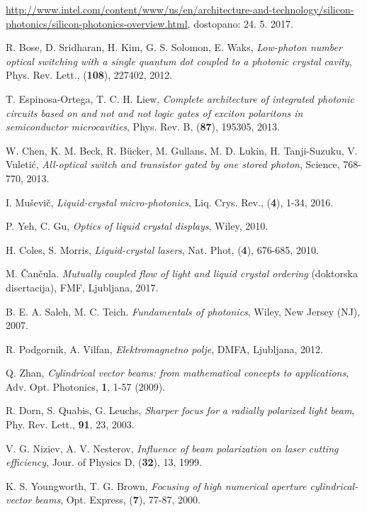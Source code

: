 \documentclass[longbibliography,slovene,a4paper,12pt]{book}
\begin{document}
\begin{thebibliography}{15}
	\url{http://www.intel.com/content/www/us/en/architecture-and-technology/silicon-photonics/silicon-photonics-overview.html}, dostopano: 24. 5. 2017.

	R. Bose, D. Sridharan, H. Kim, G. S. Solomon, E. Waks, 
	\emph{Low-photon number optical switching with a single quantum dot coupled to a photonic crystal cavity},
	Phys. Rev. Lett., (\textbf{108}), 227402, 2012.

	T. Espinosa-Ortega, T. C. H. Liew,
	\emph{Complete architecture of integrated photonic circuits based on and not and not logic gates of exciton polaritons in semiconductor microcavities},
	Phys. Rev. B, (\textbf{87}), 195305, 2013.

	W. Chen, K. M. Beck, R. Bücker, M. Gullans, M. D. Lukin, H. Tanji-Suzuku, V. Vuletić,
	\emph{All-optical switch and transistor gated by one stored photon},
	Science, 768-770, 2013.
	
	I. Muševič,
	\emph{Liquid-crystal micro-photonics},
	Liq. Crys. Rev., (\textbf{4}), 1-34, 2016.

	P. Yeh, C. Gu, 
	\emph{Optics of liquid crystal displays},
	Wiley, 2010.

	H. Coles, S. Morris,
	\emph{Liquid-crystal lasers},
	Nat. Phot, (\textbf{4}), 676-685, 2010.

	M. Čančula.
	\emph{Mutually coupled flow of light and liquid crystal ordering} (doktorska disertacija),
	FMF, Ljubljana, 2017.
	
	B. E. A. Saleh, M. C. Teich.
	\emph{Fundamentals of photonics},
	Wiley, New Jersey (NJ), 2007.
	
	R. Podgornik, A. Vilfan,
	\emph{Elektromagnetno polje},
	DMFA, Ljubljana, 2012.



	Q. Zhan,
	\emph{Cylindrical vector beams: from mathematical concepts to applications},
	Adv. Opt. Photonics, \textbf{1}, 1-57 (2009).

	R. Dorn, S. Quabis, G. Leuchs,
	\emph{Sharper focus for a radially polarized light beam},
	Phy. Rev. Lett., \textbf{91}, 23, 2003.
	
	V. G. Niziev, A. V. Nesterov,
	\emph{Influence of beam polarization on laser cutting efficiency},
	Jour. of Physics D, (\textbf{32}), 13, 1999.

	K. S. Youngworth, T. G. Brown,
	\emph{Focusing of high numerical aperture cylindrical-vector beams},
	Opt. Express, (\textbf{7}), 77-87, 2000.
	

\end{thebibliography}
\end{document}
